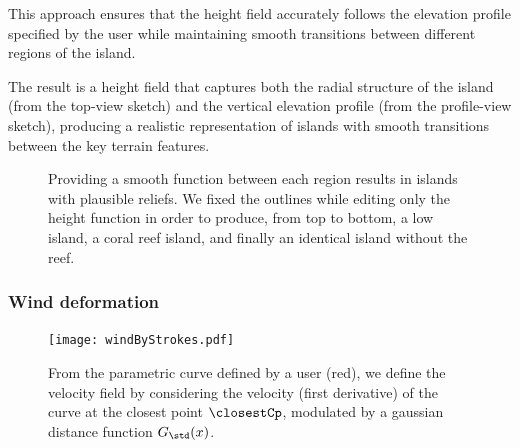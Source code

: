 This approach ensures that the height field accurately follows the elevation profile specified by the user while maintaining smooth transitions between different regions of the island.


The result is a height field that captures both the radial structure of the island (from the top-view sketch) and the vertical elevation profile (from the profile-view sketch), producing a realistic representation of islands with smooth transitions between the key terrain features.

\begin{figure}[H]
    \caption{Providing a smooth function between each region results in islands with plausible reliefs. We fixed the outlines while editing only the height function in order to produce, from top to bottom, a low island, a coral reef island, and finally an identical island without the reef. }
    \label{fig:coral-island-procedural-smooth-heights}
\end{figure}





\subsubsection{Wind deformation}
\label{sec:coral-island-wind-deformation}

\begin{figure}[H]
    \centering
    \texttt{[image: windByStrokes.pdf]}
    \caption{From the parametric curve defined by a user (red), we define the velocity field by considering the velocity (first derivative) of the curve at the closest point $\closestCp$, modulated by a gaussian distance function $G_{\std}(x)$. }
    \label{fig:coral-island-wind-from-strokes}
\end{figure}

